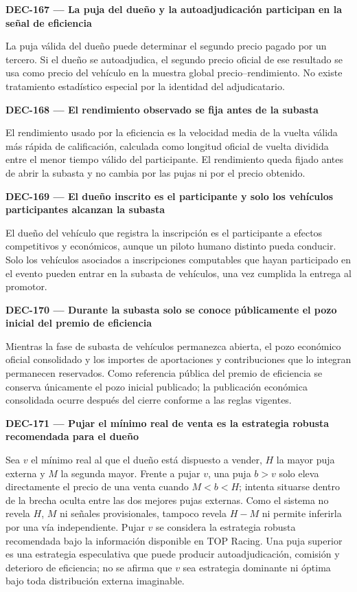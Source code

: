 \documentclass[10pt,letterpaper]{article}
\begin{document}
\noindent\textbf{DEC-167 --- La puja del dueño y la autoadjudicación participan en la señal de eficiencia}\par
La puja válida del dueño puede determinar el segundo precio pagado por un tercero. Si el dueño se autoadjudica, el segundo precio oficial de ese resultado se usa como precio del vehículo en la muestra global precio--rendimiento. No existe tratamiento estadístico especial por la identidad del adjudicatario.\par\vspace{0.45em}
\noindent\textbf{DEC-168 --- El rendimiento observado se fija antes de la subasta}\par
El rendimiento usado por la eficiencia es la velocidad media de la vuelta válida más rápida de calificación, calculada como longitud oficial de vuelta dividida entre el menor tiempo válido del participante. El rendimiento queda fijado antes de abrir la subasta y no cambia por las pujas ni por el precio obtenido.\par\vspace{0.45em}
\noindent\textbf{DEC-169 --- El dueño inscrito es el participante y solo los vehículos participantes alcanzan la subasta}\par
El dueño del vehículo que registra la inscripción es el participante a efectos competitivos y económicos, aunque un piloto humano distinto pueda conducir. Solo los vehículos asociados a inscripciones computables que hayan participado en el evento pueden entrar en la subasta de vehículos, una vez cumplida la entrega al promotor.\par\vspace{0.45em}
\noindent\textbf{DEC-170 --- Durante la subasta solo se conoce públicamente el pozo inicial del premio de eficiencia}\par
Mientras la fase de subasta de vehículos permanezca abierta, el pozo económico oficial consolidado y los importes de aportaciones y contribuciones que lo integran permanecen reservados. Como referencia pública del premio de eficiencia se conserva únicamente el pozo inicial publicado; la publicación económica consolidada ocurre después del cierre conforme a las reglas vigentes.\par\vspace{0.45em}
\noindent\textbf{DEC-171 --- Pujar el mínimo real de venta es la estrategia robusta recomendada para el dueño}\par
Sea $v$ el mínimo real al que el dueño está dispuesto a vender, $H$ la mayor puja externa y $M$ la segunda mayor. Frente a pujar $v$, una puja $b>v$ solo eleva directamente el precio de una venta cuando $M<b<H$; intenta situarse dentro de la brecha oculta entre las dos mejores pujas externas. Como el sistema no revela $H$, $M$ ni señales provisionales, tampoco revela $H-M$ ni permite inferirla por una vía independiente. Pujar $v$ se considera la estrategia robusta recomendada bajo la información disponible en TOP Racing. Una puja superior es una estrategia especulativa que puede producir autoadjudicación, comisión y deterioro de eficiencia; no se afirma que $v$ sea estrategia dominante ni óptima bajo toda distribución externa imaginable.\par\vspace{0.45em}
\end{document}
